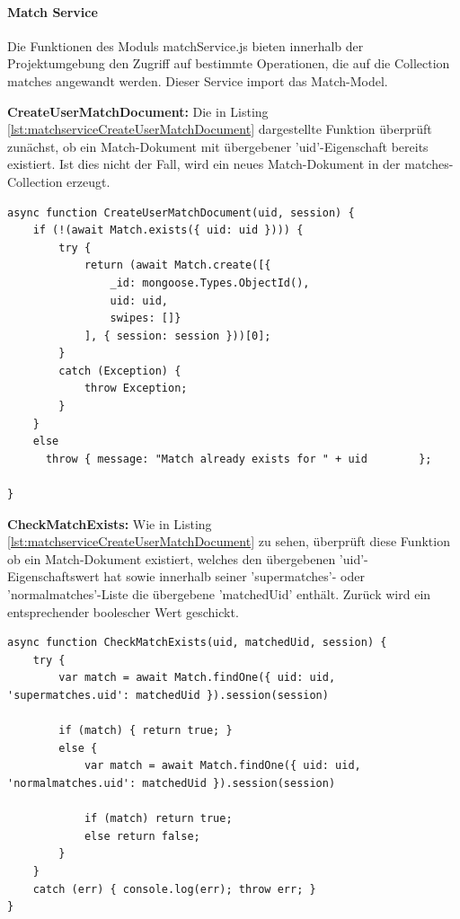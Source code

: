 \paragraph{Match Service}
Die Funktionen des Moduls matchService.js bieten innerhalb der Projektumgebung den Zugriff auf bestimmte Operationen, die auf die Collection matches angewandt werden. Dieser Service import das Match-Model.

\noindent
\textbf{CreateUserMatchDocument:}
Die in Listing \ref{lst:matchserviceCreateUserMatchDocument} dargestellte Funktion überprüft zunächst, ob ein Match-Dokument mit übergebener 'uid'-Eigenschaft bereits existiert. Ist dies nicht der Fall, wird ein neues Match-Dokument in der matches-Collection erzeugt.\\

\begin{lstlisting}[caption=Match Service - CreateUserMatchDocument, label=lst:matchserviceCreateUserMatchDocument]
async function CreateUserMatchDocument(uid, session) {
    if (!(await Match.exists({ uid: uid }))) {
        try {
            return (await Match.create([{
                _id: mongoose.Types.ObjectId(),
                uid: uid,
                swipes: []}
            ], { session: session }))[0];
        }
        catch (Exception) {
            throw Exception;
        }
    }
    else 
      throw { message: "Match already exists for " + uid 		};
    
}
\end{lstlisting}

\noindent
\textbf{CheckMatchExists:}
Wie in Listing \ref{lst:matchserviceCreateUserMatchDocument} zu sehen, überprüft diese  Funktion ob ein Match-Dokument existiert, welches den übergebenen 'uid'-Eigenschaftswert hat sowie innerhalb seiner 'supermatches'- oder 'normalmatches'-Liste die übergebene 'matchedUid' enthält. Zurück wird ein entsprechender boolescher Wert geschickt. 

\begin{lstlisting}[caption=Match Service - CreateUserMatchDocument, label=lst:matchserviceCreateUserMatchDocument]
async function CheckMatchExists(uid, matchedUid, session) {
    try {
        var match = await Match.findOne({ uid: uid, 'supermatches.uid': matchedUid }).session(session)

        if (match) { return true; }
        else {
            var match = await Match.findOne({ uid: uid, 'normalmatches.uid': matchedUid }).session(session)

            if (match) return true;
            else return false;
        }
    }
    catch (err) { console.log(err); throw err; }
}
\end{lstlisting}

